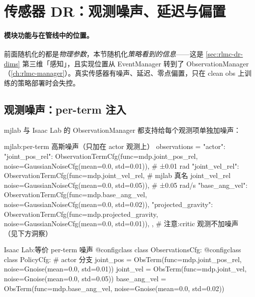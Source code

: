 \section{传感器 DR：观测噪声、延迟与偏置}
\label{sec:rlmc-dr-sensor}

\paragraph{模块功能与在管线中的位置。}前面随机化的都是\emph{物理参数}，本节随机化\emph{策略看到的信息}——这是 \cref{sec:rlmc-dr-dims} 第三维「感知」，且实现位置从 EventManager 转到了 ObservationManager（\cref{ch:rlmc-manager}）。真实传感器有噪声、延迟、零点偏置，只在 clean obs 上训练的策略部署时会失控。

\subsection{观测噪声：per-term 注入}
\label{sec:rlmc-dr-sensor-noise}

mjlab 与 Isaac Lab 的 ObservationManager 都支持给每个观测项单独加噪声：

\begin{codebox}[Python]{mjlab:per-term 高斯噪声（只加在 actor 观测上）}
observations = {
  "actor": {
    "joint_pos_rel": ObservationTermCfg(func=mdp.joint_pos_rel,
        noise=GaussianNoiseCfg(mean=0.0, std=0.01)),   # ±0.01 rad
    "joint_vel_rel": ObservationTermCfg(func=mdp.joint_vel_rel,  # mjlab 真名 joint_vel_rel
        noise=GaussianNoiseCfg(mean=0.0, std=0.05)),   # ±0.05 rad/s
    "base_ang_vel":  ObservationTermCfg(func=mdp.base_ang_vel,
        noise=GaussianNoiseCfg(mean=0.0, std=0.02)),
    "projected_gravity": ObservationTermCfg(func=mdp.projected_gravity,
        noise=GaussianNoiseCfg(mean=0.0, std=0.01)),
  },
  # 注意:critic 观测不加噪声（见下方洞察）
}
\end{codebox}

\begin{codebox}[Python]{Isaac Lab:等价 per-term 噪声}
@configclass
class ObservationsCfg:
    @configclass
    class PolicyCfg:                                    # actor 分支
        joint_pos    = ObsTerm(func=mdp.joint_pos_rel,
            noise=Gnoise(mean=0.0, std=0.01))
        joint_vel    = ObsTerm(func=mdp.joint_vel,
            noise=Gnoise(mean=0.0, std=0.05))
        base_ang_vel = ObsTerm(func=mdp.base_ang_vel,
            noise=Gnoise(mean=0.0, std=0.02))
\end{codebox}

